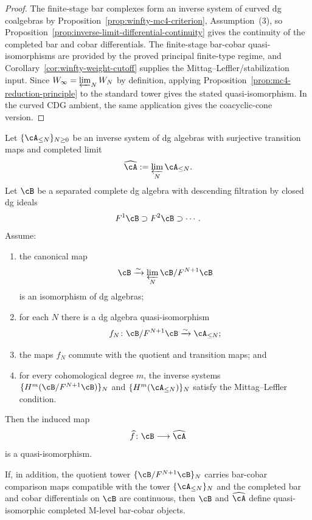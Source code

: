 \begin{proof}
The finite-stage bar complexes form an inverse system of curved dg
coalgebras by Proposition~\ref{prop:winfty-mc4-criterion},
Assumption~\textup{(3)}, so
Proposition~\ref{prop:inverse-limit-differential-continuity} gives the
continuity of the completed bar and cobar differentials. The
finite-stage bar-cobar quasi-isomorphisms are provided by the proved
principal finite-type regime, and
Corollary~\ref{cor:winfty-weight-cutoff} supplies the
Mittag--Leffler/stabilization input. Since
$W_\infty = \varprojlim_N W_N$ by definition, applying
Proposition~\ref{prop:mc4-reduction-principle} to the standard tower
gives the stated quasi-isomorphism.
In the curved CDG ambient, the same application gives the
coacyclic-cone version.
\end{proof}

\begin{proposition}
\label{prop:completed-target-comparison}
Let $\{\cA_{\le N}\}_{N \ge 0}$ be an inverse system of dg algebras with
surjective transition maps and completed limit
\[
\widehat{\cA}:=\varprojlim_N \cA_{\le N}.
\]
Let $\cB$ be a separated complete dg algebra with descending filtration
by closed dg ideals
\[
F^1\cB \supset F^2\cB \supset \cdots.
\]
Assume:
\begin{enumerate}
\item the canonical map
 \[
 \cB \xrightarrow{\sim} \varprojlim_N \cB/F^{N+1}\cB
 \]
 is an isomorphism of dg algebras;
\item for each $N$ there is a dg algebra quasi-isomorphism
 \[
 f_N\colon \cB/F^{N+1}\cB \xrightarrow{\sim} \cA_{\le N};
 \]
\item the maps $f_N$ commute with the quotient and transition maps; and
\item for every cohomological degree $m$, the inverse systems
 $\{H^m(\cB/F^{N+1}\cB)\}_N$ and $\{H^m(\cA_{\le N})\}_N$ satisfy the
 Mittag--Leffler condition.
\end{enumerate}
Then the induced map
\[
\widehat f\colon \cB \longrightarrow \widehat{\cA}
\]
is a quasi-isomorphism.

If, in addition, the quotient tower $\{\cB/F^{N+1}\cB\}_N$ carries
bar-cobar comparison maps compatible with the tower
$\{\cA_{\le N}\}_N$ and the completed bar and cobar differentials on
$\cB$ are continuous, then $\cB$ and $\widehat{\cA}$ define
quasi-isomorphic completed M-level bar-cobar objects.
\end{proposition}

